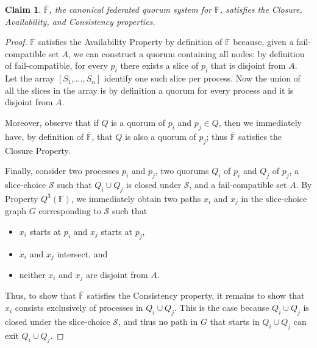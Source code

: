 \documentclass[11pt]{article}
\newtheorem{claim}{Claim}
\begin{document}
\begin{claim}
 $\overline{\mathbb{F}}$, the canonical federated quorum system for $\mathbb{F}$, satisfies the Closure, Availability, and Consistency properties.
\end{claim}
\begin{proof}
  $\overline{\mathbb{F}}$ satisfies the Availability Property by definition of $\overline{\mathbb{F}}$ because, given a fail-compatible set $A$, we can construct a quorum containing all nodes: by definition of fail-compatible, for every $p_i$ there exists a slice of $p_i$ that is disjoint from $A$. Let the array $\left[S_1,...,S_n\right]$ identify one such slice per process. Now the union of all the slices in the array is by definition a quorum for every process and it is disjoint from $A$.

  Moreover, observe that if $Q$ is a quorum of $p_i$ and $p_j\in Q$, then we immediately have, by definition of $\overline{\mathbb{F}}$, that $Q$ is also a quorum of $p_j$; thus $\overline{\mathbb{F}}$ satisfies the Closure Property.

  Finally, consider two processes $p_i$ and $p_j$, two quorums $Q_i$ of $p_i$ and $Q_j$ of $p_j$, a slice-choice $\mathcal{S}$ such that $Q_i\cup Q_j$ is closed under $\mathcal{S}$, and a fail-compatible set $A$. By Property $Q^3(\mathbb{F})$, we immediately obtain two paths $x_i$ and $x_j$ in the slice-choice graph $G$ corresponding to $\mathcal{S}$ such that
    \begin{itemize}
      \item $x_i$ starts at $p_i$ and $x_j$ starts at $p_j$,
      \item $x_i$ and $x_j$ intersect, and
      \item neither $x_i$ and $x_j$ are disjoint from $A$.
    \end{itemize}
    Thus, to show that $\overline{\mathbb{F}}$ satisfies the Consistency property, it remains to show that $x_i$ consists exclusively of processes in $Q_i\cup Q_j$. This is the case because $Q_i\cup Q_j$ is closed under the slice-choice $\mathcal{S}$, and thus no path in $G$ that starts in $Q_i\cup Q_j$ can exit $Q_i\cup Q_j$.
\end{proof}
\end{document}
